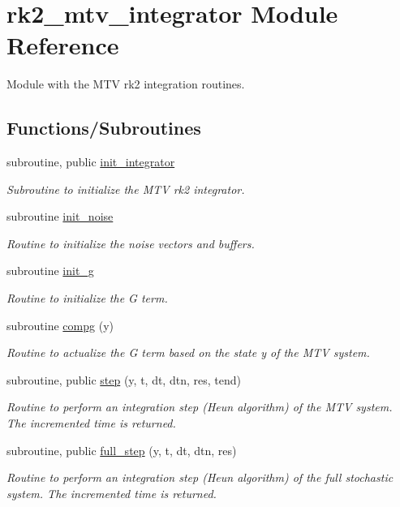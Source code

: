 \hypertarget{namespacerk2__mtv__integrator}{}\section{rk2\+\_\+mtv\+\_\+integrator Module Reference}
\label{namespacerk2__mtv__integrator}


Module with the M\+TV rk2 integration routines.  


\subsection*{Functions/\+Subroutines}
\begin{DoxyCompactItemize}
\item 
subroutine, public \hyperlink{namespacerk2__mtv__integrator_ac898de547481bd9af9cf76abf7972b3a}{init\+\_\+integrator}
\begin{DoxyCompactList}\small\item\em Subroutine to initialize the M\+TV rk2 integrator. \end{DoxyCompactList}\item 
subroutine \hyperlink{namespacerk2__mtv__integrator_a2e6d01c401a4baf9ae1a5046793ca4f9}{init\+\_\+noise}
\begin{DoxyCompactList}\small\item\em Routine to initialize the noise vectors and buffers. \end{DoxyCompactList}\item 
subroutine \hyperlink{namespacerk2__mtv__integrator_a6f4eeef9bfd2b9097251da6c7e17cc24}{init\+\_\+g}
\begin{DoxyCompactList}\small\item\em Routine to initialize the G term. \end{DoxyCompactList}\item 
subroutine \hyperlink{namespacerk2__mtv__integrator_aad1f3a82362ff6e64d0e5587d285bbde}{compg} (y)
\begin{DoxyCompactList}\small\item\em Routine to actualize the G term based on the state y of the M\+TV system. \end{DoxyCompactList}\item 
subroutine, public \hyperlink{namespacerk2__mtv__integrator_ad2806f20979d8c2cda13367addb63b3b}{step} (y, t, dt, dtn, res, tend)
\begin{DoxyCompactList}\small\item\em Routine to perform an integration step (Heun algorithm) of the M\+TV system. The incremented time is returned. \end{DoxyCompactList}\item 
subroutine, public \hyperlink{namespacerk2__mtv__integrator_a6f7d6995f02f84e6967e1ae169c38014}{full\+\_\+step} (y, t, dt, dtn, res)
\begin{DoxyCompactList}\small\item\em Routine to perform an integration step (Heun algorithm) of the full stochastic system. The incremented time is returned. \end{DoxyCompactList}\end{DoxyCompactItemize}
